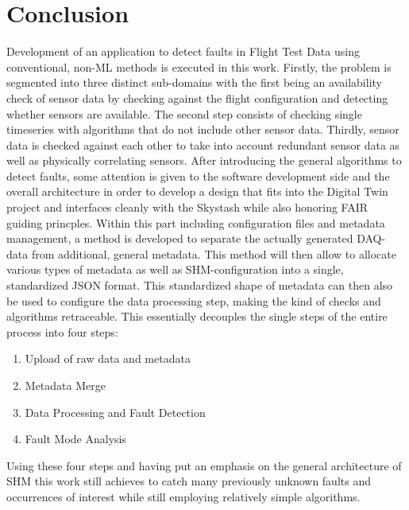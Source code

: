 \chapter{Conclusion}
Development of an application to detect faults in Flight Test Data using conventional, non-ML methods is executed in this work. Firstly, the problem is segmented into three distinct sub-domains with the first being an availability check of sensor data by checking against the flight configuration and detecting whether sensors are available. The second step consists of checking single timeseries with algorithms that do not include other sensor data.  Thirdly, sensor data is checked against each other to take into account redundant sensor data as well as physically correlating sensors. After introducing the general algorithms to detect faults, some attention is given to the software development side and the overall architecture in order to develop a design that fits into the Digital Twin project and interfaces cleanly with the Skystash while also honoring FAIR guiding princples. Within this part including configuration files and metadata management, a method is developed to separate the actually generated DAQ-data from additional, general metadata. This method will then allow to allocate various types of metadata as well as SHM-configuration into a single, standardized JSON format. This standardized shape of metadata can then also be used to configure the data processing step, making the kind of checks and algorithms retraceable. This essentially decouples the single steps of the entire process into four steps:

\begin{enumerate}
        \item Upload of raw data and metadata
        \item Metadata Merge
        \item Data Processing and Fault Detection
        \item Fault Mode Analysis
\end{enumerate}

Using these four steps and having put an emphasis on the general architecture of SHM this work still achieves to catch many previously unknown faults and occurrences of interest while still employing relatively simple algorithms.

